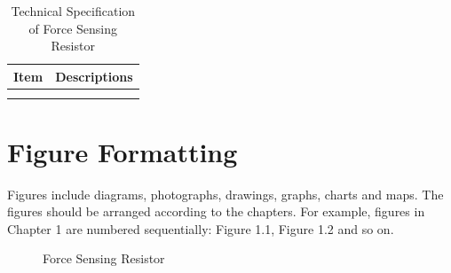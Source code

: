 \documentclass[12pt, a4paper]{report}
\begin{document}
{\begin{flushleft}
{					\begin{table}[t]
						\caption{Technical Specification of Force Sensing Resistor}
						\centering
						\begin{tabular}{|c|c|}
							\hline
							Item &  Descriptions \\
							
							\hline
							&   \\
							\hline
							&   \\
							\hline
						\end{tabular}
						\label{tab:my_label}
					\end{table}
				}
				
				\section{Figure Formatting}{
					Figures include diagrams, photographs, drawings, graphs, charts and maps. The figures should be arranged according to the chapters. For example, figures in Chapter 1 are numbered sequentially: Figure 1.1, Figure 1.2 and so on.

					\begin{figure}
						\centering
						\caption{Force Sensing Resistor}
						\label{fig:enter-label}
					\end{figure}
					
				}
			\end{flushleft}
			
		}
		
		
		
\end{document}
